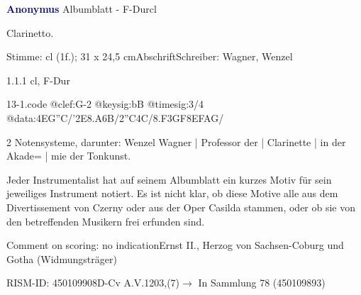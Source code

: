 \documentclass[a4paper, twocolumn, 11pt]{book}
\begin{document}
\par \vspace{16pt} \textcolor{darkblue}{\textbf{Anonymus  }}\hfillplus{[13]}\newline Albumblatt - F-Dur\newline cl
\par \begin{itshape}[heading:] Clarinetto.\end{itshape} 
\par \textcolor{darkblue}{}  Stimme: cl  (1f.); 31 x 24,5 cm\newline Abschrift\newline Schreiber: Wagner, Wenzel
\par 1.1.1  cl, F-Dur  
\begin{filecontents*}{13-1.code}
@clef:G-2
@keysig:bB
@timesig:3/4
@data:4EG''C/'2E{8.A6B}/2''C4C/{8.F3GF}{8EFAG}/
\end{filecontents*}
\newline %
\par 2 Notensysteme, darunter: Wenzel Wagner | Professor der | Clarinette | in der Akade= | mie der Tonkunst.
\par Jeder Instrumentalist hat auf seinem Albumblatt ein kurzes Motiv für sein jeweiliges Instrument notiert. Es ist nicht klar, ob diese Motive alle aus dem {\textquotedbl}Divertissement{\textquotedbl} von Czerny oder aus der Oper {\textquotedbl}Casilda{\textquotedbl} stammen, oder ob sie von den betreffenden Musikern frei erfunden sind.
\par Comment on scoring: no indication\newline Ernst II., Herzog von Sachsen-Coburg und Gotha  (Widmungsträger)
\par RISM-ID: 450109908\newline D-Cv  A.V.1203,(7)\newline $\rightarrow$ In Sammlung 78 (450109893)
      
\end{document}
